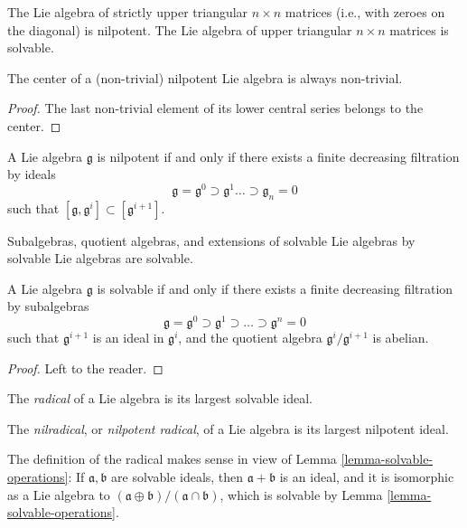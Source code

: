 \begin{example}
 \label{example-nilpotent-solvable}
The Lie algebra of strictly upper triangular $n\times n$ matrices (i.e., with zeroes on the diagonal) is nilpotent. The Lie algebra of upper triangular $n\times n$ matrices is solvable.
\end{example}

\begin{lemma}
 \label{lemma-nilpotent-center}
 The center of a (non-trivial) nilpotent Lie algebra is always non-trivial.
\end{lemma}
\begin{proof}
 The last non-trivial element of its lower central series belongs to the center.
\end{proof}




\begin{lemma}
 \label{lemma-solvable-operations}
A Lie algebra $\mathfrak g$ is nilpotent if and only if there exists a finite decreasing filtration by ideals 
$$ \mathfrak g = \mathfrak g^0 \supset \mathfrak g^1 \dots \supset \mathfrak g_n=0$$
such that $[\mathfrak g, \mathfrak g^i]\subset [\mathfrak g^{i+1}]$.
 
 
 Subalgebras, quotient algebras, and extensions of solvable Lie algebras by solvable Lie algebras are solvable.
  
   A Lie algebra $\mathfrak g$ is solvable if and only if there exists a finite decreasing filtration by subalgebras
   $$ \mathfrak g = \mathfrak g^0 \supset \mathfrak g^1 \supset \dots \supset \mathfrak g^n =0$$
   such that $\mathfrak g^{i+1}$ is an ideal in $\mathfrak g^i$, and the quotient algebra $\mathfrak g^i/\mathfrak g^{i+1}$ is abelian.
\end{lemma}

\begin{proof}
 Left to the reader.
\end{proof}



\begin{definition}
 \label{definition-radical}
The {\it radical} of a Lie algebra is its largest solvable ideal.

The {\it nilradical}, or {\it nilpotent radical}, of a Lie algebra is its largest nilpotent ideal.
\end{definition}

The definition of the radical makes sense in view of Lemma \ref{lemma-solvable-operations}: If $\mathfrak a, \mathfrak b$ are solvable ideals, then $\mathfrak a + \mathfrak b$ is an ideal, and it is isomorphic as a Lie algebra to $(\mathfrak a \oplus \mathfrak b)/(\mathfrak a\cap \mathfrak b)$, which is solvable by Lemma \ref{lemma-solvable-operations}.


